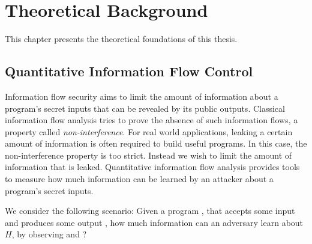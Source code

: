 \chapter{Theoretical Background}\label{sec:basics}

This chapter presents the theoretical foundations of this thesis. 

\section{Quantitative Information Flow Control}


Information flow security aims to limit the amount of information about a program's secret inputs that can be revealed by its public outputs. Classical information flow analysis tries to prove the absence of such information flows, a property called \emph{non-interference}.
For real world applications, leaking a certain amount of information is often required to build useful programs. In this case, the non-interference property is too strict. Instead we wish to limit the amount of information that is leaked.
Quantitative information flow analysis provides tools to measure how much information can be learned by an attacker about a program's secret inputs.



We consider the following scenario: Given a program \p, that accepts some input \In and produces some output \Out, how much information can an adversary \A learn about $H$, by observing \p and \Out?

